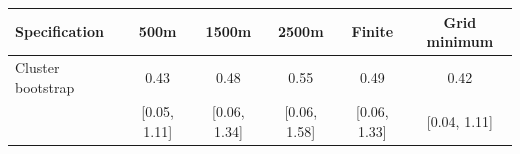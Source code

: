 \begin{tabular}{lccccc}
\toprule
Specification & 500m & 1500m & 2500m & Finite & Grid minimum \\
\midrule
Cluster bootstrap & 0.43 & 0.48 & 0.55 & 0.49 & 0.42 \\
 & [0.05, 1.11] & [0.06, 1.34] & [0.06, 1.58] & [0.06, 1.33] & [0.04, 1.11] \\
\bottomrule
\end{tabular}

